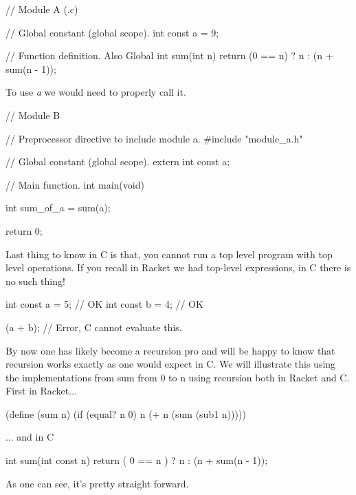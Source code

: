 \begin{code}[C]
// Module A (.c)

// Global constant (global scope).
int const a = 9;

// Function definition.  Also Global
int sum(int n) 
{
	return (0 == n) ? n : (n + sum(n - 1));
}
\end{code}

To use \emph{a} we would need to properly call it.\\

\begin{code}[C]
// Module B

// Preprocessor directive to include module a.
#include "module_a.h"

// Global constant (global scope).
extern int const a;

// Main function.
int main(void)
{
	int sum_of_a = sum(a);	
	
	return 0;
}
\end{code}

Last thing to know in C is that, you cannot run a top level program with top level operations.  If you recall in Racket we had top-level expressions, in C there is no such thing!\\

\begin{code}[C]
int const a = 5; // OK
int const b = 4; // OK

(a + b); // Error, C cannot evaluate this.
\end{code}


By now one has likely become a recursion pro and will be happy to know that recursion works exactly as one would expect in C.  We will illustrate this using the implementations from sum from 0 to n using recursion both in Racket and C.\\

First in Racket...\\
\begin{code}[Lisp]
(define (sum n)
	(if (equal? n 0) n (+ n (sum (sub1 n)))))
\end{code}

... and in C\\
\begin{code}[C]
int sum(int const n)
{
	return ( 0 == n ) ? n : (n + sum(n - 1));
}
\end{code}

As one can see, it's pretty straight forward.\\




  